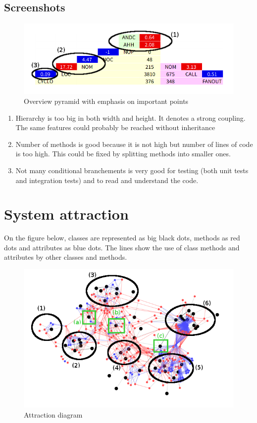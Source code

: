 \subsection{Screenshots}

\begin{figure}[H]
    \includegraphics[width=\textwidth]{OverviewPyramid_annotated.png}
    \caption{\label{fig:pyramid}Overview pyramid with emphasis on important points}
\end{figure}

\begin{enumerate}
    \item Hierarchy is too big in both width and height. It denotes a strong coupling. The same features could probably be reached without inheritance
    \item Number of methods is good because it is not high but number of lines of code is too high. This could be fixed by splitting methods into smaller ones.
    \item Not many conditional branchements is very good for testing (both unit tests and integration tests) and to read and understand the code.
\end{enumerate}

\section{System attraction}
On the figure below, classes are represented as big black dots, methods as red dots and attributes as blue dots. The lines show the use of class methods and attributes by other classes and methods.

\begin{figure}[H]
    \includegraphics[width=\textwidth]{Attraction_annotated.png}
    \caption{\label{fig:attraction} Attraction diagram}
\end{figure}

